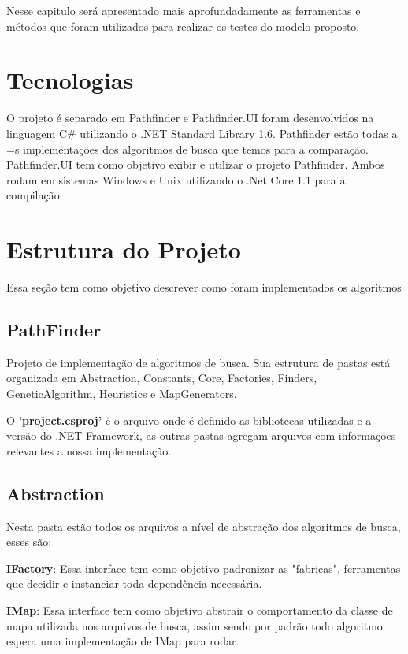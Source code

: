 Nesse capitulo será apresentado mais aprofundadamente as ferramentas e métodos que foram utilizados para realizar os testes do modelo proposto.

\section{Tecnologias}
O projeto é separado em Pathfinder e Pathfinder.UI foram desenvolvidos na linguagem C\# utilizando o .NET Standard Library 1.6. Pathfinder estão todas a =s implementações dos algoritmos de busca que temos para a comparação. Pathfinder.UI tem como objetivo exibir e utilizar o projeto Pathfinder. Ambos rodam em sistemas Windows e Unix utilizando o .Net Core 1.1 para a compilação.

\section{Estrutura do Projeto}

Essa seção tem como objetivo descrever como foram implementados os algoritmos 

\subsection {PathFinder}

Projeto de implementação de algoritmos de busca.
Sua estrutura de pastas está organizada em Abstraction, Constants, Core, Factories, Finders, GeneticAlgorithm, Heuristics e MapGenerators.

O \textbf{'project.csproj'} é o arquivo onde é definido as bibliotecas utilizadas e a versão do .NET Framework, as outras pastas agregam arquivos com informações relevantes a nossa implementação.

\subsection{Abstraction}	

Nesta pasta estão todos os arquivos a nível de abstração dos algoritmos de busca, esses são:

\textbf{IFactory}: Essa interface tem como objetivo padronizar as "fabricas", ferramentas que decidir e instanciar toda dependência necessária.

\textbf{IMap}: Essa interface tem como objetivo abstrair o comportamento da classe de mapa utilizada nos arquivos de busca, assim sendo por padrão todo algoritmo espera uma implementação de IMap para rodar.

